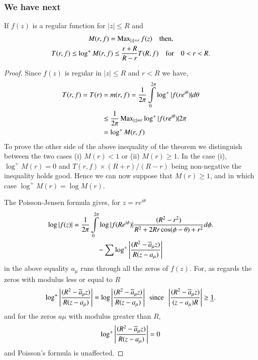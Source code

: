 \subsubsection{We have next}\label{part1-subsubsec1.7.1}  

\begin{thm}\label{part1-thm4}
If $f(z)$ is a regular function for $|z|\leq R$ and 
\begin{gather*}
M(r,f)=\operatorname{Max}\limits_{|z|=r}f(z)\quad\text{then,}\\
T(r,f)\leq \log^{+}M(r,f)\leq
\frac{r+R}{R-r}T(R,f)\quad\text{for}\quad 0<r<R.
\end{gather*}
\end{thm}

\begin{proof}
Since $f(z)$ is regular in $|z|\leq R$ and $r<R$ we have, 
\begin{align*}
T(r,f)=T(r) &=
m(r,f)=\frac{1}{2\pi}\int\limits^{2\pi}_{0}\log^{+}|f(re^{i\theta})|d\theta\\
&\leq \frac{1}{2\pi}\operatorname{Max}\limits_{|z|=r}\log^{+}|f(re^{i\theta})|2\pi\\
&= \log^{+}M(r,f)
\end{align*}\pageoriginale
To prove the other side of the above inequality of the theorem we
distinguish between the two cases (i) $M(r)<1$ or (ii) $M(r)\geq
1$. In the case (i), $\log^{+}M(r)=0$ and $T(r,f)\times (R+r)/(R-r)$
being non-negative the inequality holds good. Hence we can now suppose
that $M(r)\geq 1$, and in which case $\log^{+}M(r)=\log M(r)$.

The Poisson-Jensen formula gives, for $z=re^{i\theta}$
\begin{gather*}
\log
|f(z)| = \frac{1}{2\pi}\int\limits^{2\pi}_{0}\log|f(Re^{i\phi})|\frac{(R^{2}-r^{2})}{R^{2}+2Rr\cos(\phi-\theta)+r^{2}}d\phi.\\
-\sum \log^{+}\left|\frac{(R^{2}-\overline{a}_{\mu} z)}{R(z-a_{\mu})}\right|
\end{gather*}
in the above equality $a_{\mu}$ runs through all the zeros of
$f(z)$. For, as regards the zeros with modulus less or equal to $R$
$$
\log^{+}\left|\frac{(R^{2}-\overline{a}_{\mu}z)}{R(z-a_{\mu})}\right|=\log
\left|\frac{(R^{2}-\overline{a}_{\mu}z)}{R(z-a_{\mu})}\right|\text{ \ since
  \ } \left|\frac{(R^{2}-\overline{a}_{\mu}z)}{(z-a_{\mu})R}\right|\geq
\underline{1}.
$$
and for the zeros $a \mu$ with modulus greater than $R$,
$$
\log^{+}\left|\frac{(R^{2}-\overline{a}_{\mu}z)}{R(z-a_{\mu})}\right|=0
$$
and Poisson's formula is unaffected.
\end{proof}

